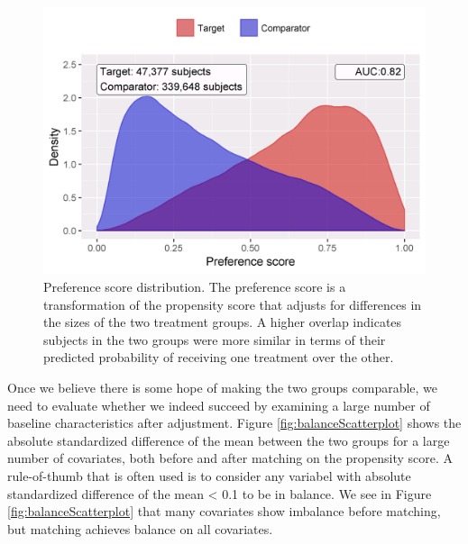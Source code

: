 \documentclass[]{book}
\begin{document}
\begin{figure}

{\centering \includegraphics[width=0.8\linewidth]{images/MethodValidity/ps} 

}

\caption{Preference score distribution. The preference score is a transformation of the propensity score that adjusts for differences in the sizes of the two treatment groups. A higher overlap indicates subjects in the two groups were more similar in terms of their predicted probability of receiving one treatment over the other.}\label{fig:ps}
\end{figure}

Once we believe there is some hope of making the two groups comparable,
we need to evaluate whether we indeed succeed by examining a large
number of baseline characteristics after adjustment. Figure
\ref{fig:balanceScatterplot} shows the absolute standardized difference
of the mean between the two groups for a large number of covariates,
both before and after matching on the propensity score. A rule-of-thumb
that is often used is to consider any variabel with absolute
standardized difference of the mean \textless{} 0.1 to be in balance. We
see in Figure \ref{fig:balanceScatterplot} that many covariates show
imbalance before matching, but matching achieves balance on all
covariates.
\end{document}
